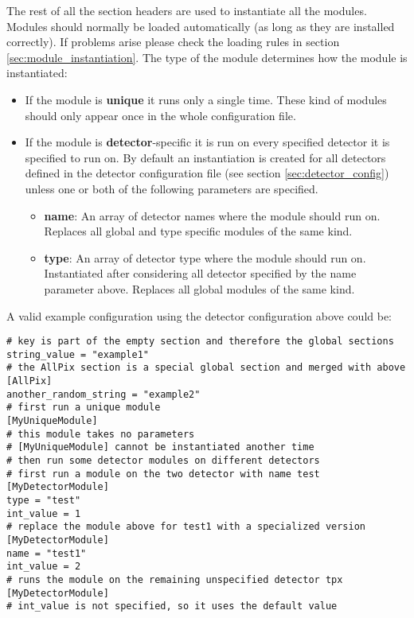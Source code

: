 The rest of all the section headers are used to instantiate all the modules. Modules should normally be loaded automatically (as long as they are installed correctly). If problems arise please check the loading rules in section \ref{sec:module_instantiation}. The type of the module determines how the module is instantiated:
\begin{itemize}
\item If the module is \textbf{unique} it runs only a single time. These kind of modules should only appear once in the whole configuration file.
\item If the module is \textbf{detector}-specific it is run on every specified detector it is specified to run on. By default an instantiation is created for all detectors defined in the detector configuration file (see section \ref{sec:detector_config}) unless one or both of the following parameters are specified.
\begin{itemize}
\item \textbf{name}: An array of detector names where the module should run on. Replaces all global and type specific modules of the same kind.
\item \textbf{type}: An array of detector type where the module should run on. Instantiated after considering all detector specified by the name parameter above. Replaces all global modules of the same kind. 
\end{itemize}
\end{itemize}

A valid example configuration using the detector configuration above could be:
\begin{verbatim}
# key is part of the empty section and therefore the global sections
string_value = "example1"
# the AllPix section is a special global section and merged with above
[AllPix]
another_random_string = "example2"
# first run a unique module
[MyUniqueModule]
# this module takes no parameters
# [MyUniqueModule] cannot be instantiated another time
# then run some detector modules on different detectors 
# first run a module on the two detector with name test
[MyDetectorModule]
type = "test"
int_value = 1
# replace the module above for test1 with a specialized version 
[MyDetectorModule]
name = "test1"
int_value = 2
# runs the module on the remaining unspecified detector tpx
[MyDetectorModule]
# int_value is not specified, so it uses the default value
\end{verbatim}

